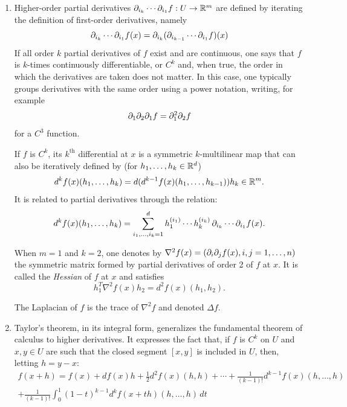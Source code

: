 \begin{enumerate}[label={\bf \arabic*.}]
Consider now the function $\mathfrak I(A) = A\mapsto A^{-1}$ defined on $\CG\CL_d(\mR)$, which is an open subset of $\CM_d(\mR)$. Using $A\mathfrak I(A) = \Id[d]$ and the product rule, we get
\[
A (d\mathfrak I(A) H) + H \mathfrak I(A) = 0
\]
or
\begin{equation}
\label{eq:inv.der}
d\mathfrak I(A) H = - A^{-1} H A^{-1}.
\end{equation}

\item 
Higher-order partial derivatives $\partial_{i_k} \cdots \partial_{i_1} f : U \to {\mathbb{R}}^m$ are defined by iterating the definition of first-order derivatives, namely 
\[
\partial_{i_k} \cdots \partial_{i_1} f(x) = \partial_{i_k} (\partial_{i_{k-1}} \cdots \partial_{i_1} f)(x)
\]
If all order $k$ partial derivatives of $f$ exist and are continuous, one says that $f$ is $k$-times continuously differentiable, or $C^k$ and, when true, the order in which the derivatives are taken does not matter. In this case,  one typically groups derivatives with the same order using a power notation, writing, for example
\[
\partial_1 \partial_2 \partial_1 f = \partial_1^2 \partial_2 f
\]
for a $C^3$ function.

If $f$ is $C^k$, its $k^{\mathrm{th}}$ differential at $x$ is a symmetric $k$-multilinear map that can also be iteratively defined by (for $h_1, \ldots, h_k\in {\mathbb{R}}^d$)
\[
d^k f(x)(h_1, \ldots, h_k) = d(d^{k-1}f(x)(h_1, \ldots, h_{k-1})) h_k  \in {\mathbb{R}}^m.
\]
It is related to partial derivatives through the relation:
\[
d^k f(x)(h_1, \ldots, h_k) = \sum_{i_1, \ldots, i_k=1}^d  h_1^{(i_1)} \cdots h_k^{(i_k)}\,\partial_{i_k} \cdots \partial_{i_1} f(x).
\]

When $m=1$ and $k=2$, one denotes by $\nabla^2 f(x) = (\partial_i\partial_j f(x), i,j=1, \ldots, n)$ the symmetric  matrix formed by partial derivatives of order 2 of $f$ at $x$. It is called the {\em Hessian} of $f$ at $x$ and satisfies
\[
h_1^T \nabla^2 f(x) h_2 =  d^2 f(x)(h_1, h_2).
\]

The Laplacian of $f$ is the trace of $\nabla^2 f$ and denoted $\Delta f$.

\item
Taylor's theorem, in its integral form, generalizes the fundamental theorem of calculus to higher derivatives. It expresses the fact that, if $f$ is $C^k$ on $U$ and $x,y\in U$ are such that the closed segment $[x,y]$ is included in $U$, then, letting $h = y-x$:
\begin{multline}
f(x+h) = f(x) + df(x) h + \frac12 d^2 f(x)(h,h) + \cdots + \frac1{(k-1)!} d^{k-1}f(x)(h, \ldots, h) \\
+ \frac1{(k-1)!} \int_0^1 (1-t)^{k-1}d^kf(x+th)(h, \ldots, h)\, dt
\label{eq:taylor}
\end{multline}


\end{enumerate}
